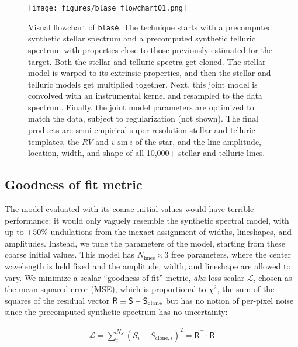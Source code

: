 \documentclass[modern]{aastex631}
\begin{document}
\begin{figure}[hbt!]
    \centering
    \texttt{[image: figures/blase\_flowchart01.png]}
    \caption{Visual flowchart of \texttt{blas\'e}.  The technique starts with a precomputed synthetic stellar spectrum and a precomputed synthetic telluric spectrum with properties close to those previously estimated for the target.  Both the stellar and telluric spectra get cloned.  The stellar model is warped to its extrinsic properties, and then the stellar and telluric models get multiplied together.  Next, this joint model is convolved with an instrumental kernel and resampled to the data spectrum.  Finally, the joint model parameters are optimized to match the data, subject to regularization (not shown).  The final products are semi-empirical super-resolution stellar and telluric templates, the $RV$ and $v\sin{i}$ of the star, and the line amplitude, location, width, and shape of all 10,000+ stellar and telluric lines.  }
    \label{blase_flowchart}
\end{figure}

\subsection{Goodness of fit metric}
The model evaluated with its coarse initial values would have terrible performance: it would only vaguely resemble the synthetic spectral model, with up to $\pm 50\%$ undulations from the inexact assignment of widths, lineshapes, and amplitudes. Instead, we tune the parameters of the model, starting from these coarse initial values. This model has $N_{\mathrm{lines}}\times 3$ free parameters, where the center wavelength is held fixed and the amplitude, width, and lineshape are allowed to vary. We minimize a scalar ``goodness-of-fit'' metric, \emph{aka} loss scalar $\mathcal{L}$, chosen as the mean squared error (MSE), which is proportional to $\chi^2$, the sum of the squares of the residual vector $\mathsf{R} \equiv \mathsf{S}-\mathsf{S}_{\rm clone}$ but has no notion of per-pixel noise since the precomputed synthetic spectrum has no uncertainty:

\begin{eqnarray}
    \mathcal{L} = \sum_i^{N_S} (S_i - S_{\mathrm{clone},i})^2 = \mathsf{R^\intercal}\cdot \mathsf{R} \label{simpleLikelihood}
\end{eqnarray}
\end{document}
